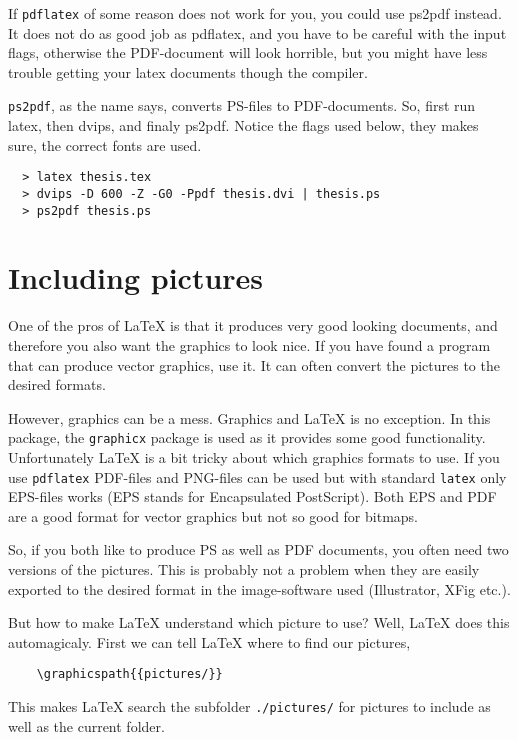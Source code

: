 \documentclass[a4paper,11pt,twoside]{report}
\begin{document}
If \texttt{pdflatex} of some reason does not work for you, you could use
ps2pdf instead. It does not do as good job as pdflatex, and
you have to be careful with the input flags, otherwise the
PDF-document will look horrible, but you might have less trouble
getting your latex documents though the compiler.

\texttt{ps2pdf}, as the name says, converts PS-files to PDF-documents. So,
first run latex, then dvips, and finaly ps2pdf. Notice the flags
used below, they makes sure, the correct fonts are used. 
\begin{verbatim}
  > latex thesis.tex
  > dvips -D 600 -Z -G0 -Ppdf thesis.dvi | thesis.ps
  > ps2pdf thesis.ps
\end{verbatim}

\section{Including pictures}

One of the pros of {\LaTeX} is that it produces very good looking
documents, and therefore you also want the graphics to look nice. If
you have found a program that can produce vector graphics, use
it. It can often convert the pictures to the desired formats. 

However, graphics can be a mess. Graphics and {\LaTeX} is no 
exception. In this package, the \texttt{graphicx} package is used 
as it provides some good functionality. Unfortunately {\LaTeX} is a bit 
tricky about which graphics  formats to use. If you use 
\texttt{pdflatex} PDF-files and PNG-files can be used but with 
standard \texttt{latex} only EPS-files works (EPS stands for
Encapsulated PostScript). Both EPS and PDF are a good format for 
vector graphics but not so good for bitmaps. 

So, if you both like to produce PS as well as PDF documents, you
often need two versions of the pictures. This is probably not a
problem when they are easily exported to the desired format in the
image-software used (Illustrator, XFig etc.). 

But how to make {\LaTeX} understand which picture to use? Well, 
{\LaTeX} does this automagicaly. First we can tell {\LaTeX} where to 
find our pictures,
\begin{verbatim}
    \graphicspath{{pictures/}}
\end{verbatim} 
This makes {\LaTeX} search the subfolder \texttt{./pictures/} for 
pictures to include as well as the current folder.
\end{document}
